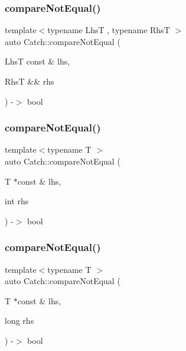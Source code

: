 \mbox{\label{namespaceCatch_a8bec217f5ef5f09c17074c311c958f3c}} 
\subsubsection{\texorpdfstring{compare\+Not\+Equal()}{compareNotEqual()}\hspace{0.1cm}{\footnotesize\ttfamily [1/5]}}
{\footnotesize\ttfamily template$<$typename LhsT , typename RhsT $>$ \\
auto Catch\+::compare\+Not\+Equal (\begin{DoxyParamCaption}\item[{LhsT const \&}]{lhs,  }\item[{RhsT \&\&}]{rhs }\end{DoxyParamCaption}) -\/$>$ bool }

\mbox{\label{namespaceCatch_aa81c95898f22dce1f61d7710e495d1ee}} 
\subsubsection{\texorpdfstring{compare\+Not\+Equal()}{compareNotEqual()}\hspace{0.1cm}{\footnotesize\ttfamily [2/5]}}
{\footnotesize\ttfamily template$<$typename T $>$ \\
auto Catch\+::compare\+Not\+Equal (\begin{DoxyParamCaption}\item[{T $\ast$const \&}]{lhs,  }\item[{int}]{rhs }\end{DoxyParamCaption}) -\/$>$ bool }

\mbox{\label{namespaceCatch_adad6539b3780b9a8953221efd038e2e4}} 
\subsubsection{\texorpdfstring{compare\+Not\+Equal()}{compareNotEqual()}\hspace{0.1cm}{\footnotesize\ttfamily [3/5]}}
{\footnotesize\ttfamily template$<$typename T $>$ \\
auto Catch\+::compare\+Not\+Equal (\begin{DoxyParamCaption}\item[{T $\ast$const \&}]{lhs,  }\item[{long}]{rhs }\end{DoxyParamCaption}) -\/$>$ bool }

